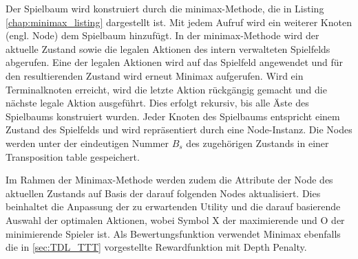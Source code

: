 Der Spielbaum wird konstruiert durch die minimax-Methode, die in Listing \cref{chap:minimax_listing} dargestellt ist. 
Mit jedem Aufruf wird ein weiterer Knoten (engl. Node) dem Spielbaum hinzufügt. 
In der minimax-Methode wird der aktuelle Zustand sowie die legalen Aktionen des intern verwalteten Spielfelds abgerufen. 
Eine der legalen Aktionen wird auf das Spielfeld angewendet und für den resultierenden Zustand wird erneut Minimax aufgerufen. 
Wird ein Terminalknoten erreicht, wird die letzte Aktion rückgängig gemacht und die nächste legale Aktion ausgeführt. 
Dies erfolgt rekursiv, bis alle Äste des Spielbaums konstruiert wurden. 
Jeder Knoten des Spielbaums entspricht einem Zustand des Spielfelds und wird repräsentiert durch eine Node-Instanz. 
Die Nodes werden unter der eindeutigen Nummer $B_{s}$ des zugehörigen Zustands in einer Transposition table gespeichert. 

Im Rahmen der Minimax-Methode werden zudem die Attribute der Node des aktuellen Zustands auf Basis der darauf folgenden Nodes aktualisiert. 
Dies beinhaltet die Anpassung der zu erwartenden Utility und die darauf basierende Auswahl der optimalen Aktionen, wobei Symbol X der maximierende und O der minimierende Spieler ist. 
Als Bewertungsfunktion verwendet Minimax ebenfalls die in \cref{sec:TDL_TTT} vorgestellte Rewardfunktion mit Depth Penalty.